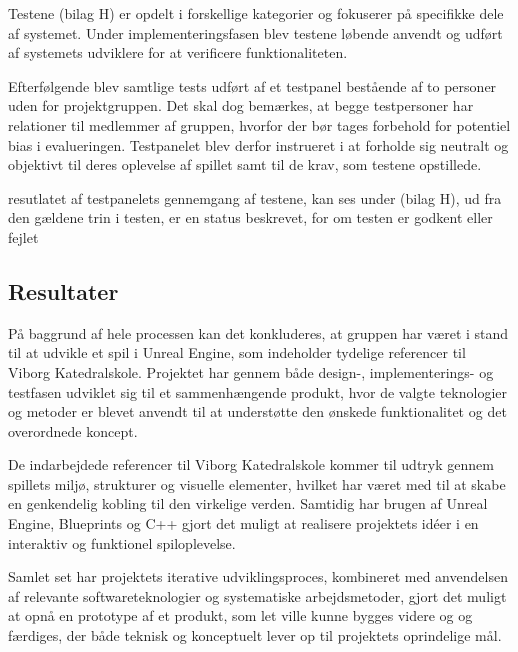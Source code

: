 Testene (bilag H) er opdelt i forskellige kategorier og fokuserer på specifikke dele af systemet. Under implementeringsfasen blev testene løbende anvendt og udført af systemets udviklere for at verificere funktionaliteten.

Efterfølgende blev samtlige tests udført af et testpanel bestående af to personer uden for projektgruppen. Det skal dog bemærkes, at begge testpersoner har relationer til medlemmer af gruppen, hvorfor der bør tages forbehold for potentiel bias i evalueringen. Testpanelet blev derfor instrueret i at forholde sig neutralt og objektivt til deres oplevelse af spillet samt til de krav, som testene opstillede.

resutlatet af testpanelets gennemgang af testene, kan ses under (bilag H), ud fra den gældene trin i testen, er en status beskrevet, for om testen er godkent eller fejlet

\subsection{Resultater}
På baggrund af hele processen kan det konkluderes, at gruppen har været i stand til at udvikle et spil i Unreal Engine, som indeholder tydelige referencer til Viborg Katedralskole. Projektet har gennem både design-, implementerings- og testfasen udviklet sig til et sammenhængende produkt, hvor de valgte teknologier og metoder er blevet anvendt til at understøtte den ønskede funktionalitet og det overordnede koncept.

De indarbejdede referencer til Viborg Katedralskole kommer til udtryk gennem spillets miljø, strukturer og visuelle elementer, hvilket har været med til at skabe en genkendelig kobling til den virkelige verden. Samtidig har brugen af Unreal Engine, Blueprints og C++ gjort det muligt at realisere projektets idéer i en interaktiv og funktionel spiloplevelse.

Samlet set har projektets iterative udviklingsproces, kombineret med anvendelsen af relevante softwareteknologier og systematiske arbejdsmetoder, gjort det muligt at opnå en prototype af et produkt, som let ville kunne bygges videre og og færdiges, der både teknisk og konceptuelt lever op til projektets oprindelige mål.